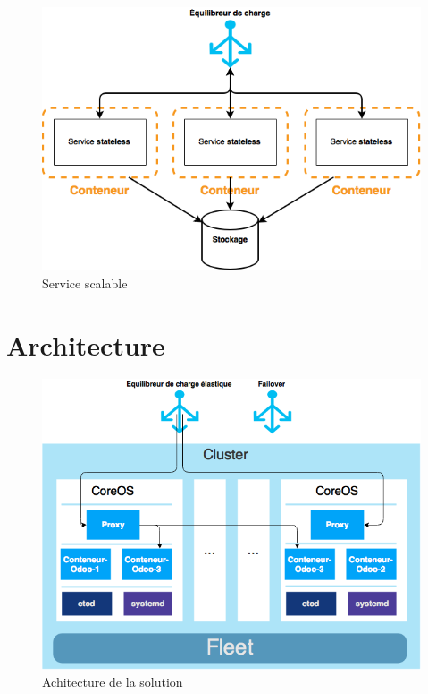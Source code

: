 \begin{onehalfspace}
\begin{figure}[H]
\centering
\includegraphics [scale=0.5]{chapitre4/assets/stateless}
\caption{Service scalable}
\label{fig:}
\end{figure}



\section{Architecture}

\begin{figure}[H]
\centering
\includegraphics [scale=0.7]{chapitre4/assets/architecture}
\caption{Achitecture de la solution}
\label{fig:}
\end{figure}






\end{onehalfspace}
